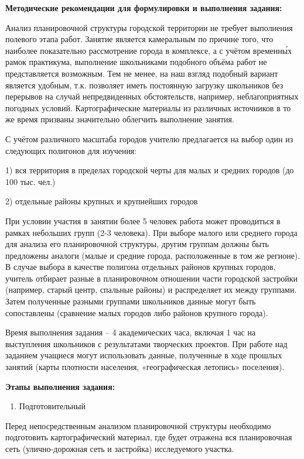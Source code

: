 \documentclass[
  11pt,
]{book}
\providecommand{\tightlist}{%
  \setlength{\itemsep}{0pt}\setlength{\parskip}{0pt}}
\begin{document}
\textbf{Методические рекомендации для формулировки и выполнения задания:}

Анализ планировочной структуры городской территории не требует выполнения полевого этапа работ. Занятие является камеральным по причине того, что наиболее показательно рассмотрение города в комплексе, а с учётом временны́х рамок практикума, выполнение школьниками подобного объёма работ не представляется возможным. Тем не менее, на наш взгляд подобный вариант является удобным, т.к. позволяет иметь постоянную загрузку школьников без перерывов на случай непредвиденных обстоятельств, например, неблагоприятных погодных условий. Картографические материалы из различных источников в то же время призваны значительно облегчить выполнение занятия.

С учётом различного масштаба городов учителю предлагается на выбор один из следующих полигонов для изучения:

1) вся территория в пределах городской черты для малых и средних городов (до 100 тыс. чел.)

2) отдельные районы крупных и крупнейших городов

При условии участия в занятии более 5 человек работа может проводиться в рамках
небольших групп (2-3 человека). При выборе малого или среднего города для
анализа его планировочной структуры, другим группам должны быть предложены
аналоги (малые и средние города, расположенные в том же регионе). В случае
выбора в качестве полигона отдельных районов крупных городов, учитель отбирает
разные в планировочном отношении части городской застройки (например, старый
центр, спальные районы) и распределяет их между группами. Затем полученные
разными группами школьников данные могут быть сопоставлены (сравнение малых
городов либо районов крупного города).

Время выполнения задания -- 4 академических часа, включая 1 час на выступления
школьников с результатами творческих проектов. При работе над заданием учащиеся могут использовать данные, полученные в ходе прошлых занятий (карты плотности населения, «географическая летопись» поселения).

\textbf{Этапы выполнения задания:}

\begin{enumerate}
\def\labelenumi{\arabic{enumi}.}
\tightlist
\item
  Подготовительный
\end{enumerate}

Перед непосредственным анализом планировочной структуры необходимо подготовить картографический материал, где будет отражена вся планировочная сеть (улично-дорожная сеть и застройка) исследуемого участка.
\end{document}
